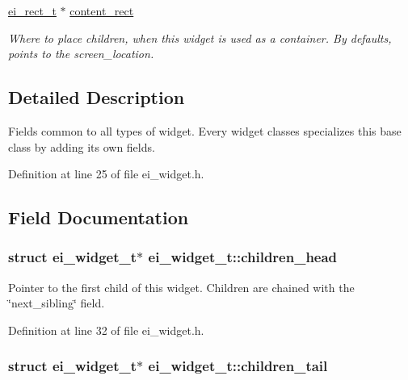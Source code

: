 \begin{DoxyCompactItemize}
\hyperlink{structei__rect__t}{ei\-\_\-rect\-\_\-t} $\ast$ \hyperlink{structei__widget__t_a75c29d388a5f5b32cdd8a9c855bc2a75}{content\-\_\-rect}
\begin{DoxyCompactList}\small\item\em Where to place children, when this widget is used as a container. By defaults, points to the screen\-\_\-location. \end{DoxyCompactList}\end{DoxyCompactItemize}


\subsection{Detailed Description}
Fields common to all types of widget. Every widget classes specializes this base class by adding its own fields. 

Definition at line 25 of file ei\-\_\-widget.\-h.



\subsection{Field Documentation}
\hypertarget{structei__widget__t_a190316f0ec41d2d98b919414c860f828}{
\subsubsection[{children\-\_\-head}]{\setlength{\rightskip}{0pt plus 5cm}struct {\bf ei\-\_\-widget\-\_\-t}$\ast$ ei\-\_\-widget\-\_\-t\-::children\-\_\-head}}\label{structei__widget__t_a190316f0ec41d2d98b919414c860f828}


Pointer to the first child of this widget. Children are chained with the \char`\"{}next\-\_\-sibling\char`\"{} field. 



Definition at line 32 of file ei\-\_\-widget.\-h.

\hypertarget{structei__widget__t_aece2f3059f252538ae787857e7eea2a2}{
\subsubsection[{children\-\_\-tail}]{\setlength{\rightskip}{0pt plus 5cm}struct {\bf ei\-\_\-widget\-\_\-t}$\ast$ ei\-\_\-widget\-\_\-t\-::children\-\_\-tail}}\label{structei__widget__t_aece2f3059f252538ae787857e7eea2a2}


